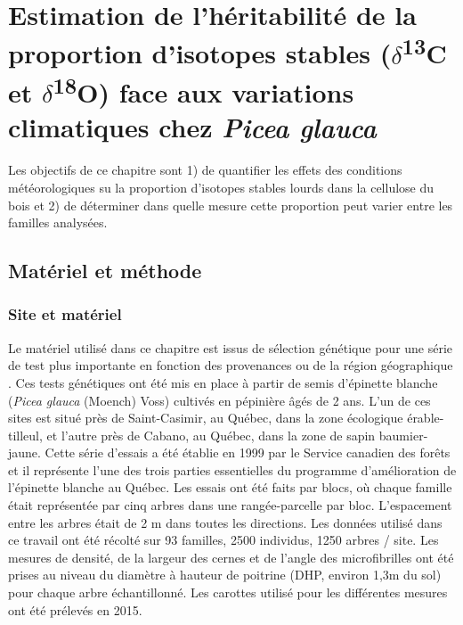 \documentclass{report}
\newcommand{\Ctreize}{$\delta$\textsuperscript{13}C\xspace}
\newcommand{\Odixhuit}{$\delta$\textsuperscript{18}O\xspace}
\begin{document}
\chapter{Estimation de l'héritabilité de la proportion d'isotopes stables (\Ctreize et \Odixhuit) face aux variations climatiques chez \textit{Picea glauca}}


Les objectifs de ce chapitre sont 1) de quantifier les effets des conditions météorologiques su la proportion d'isotopes stables lourds dans la cellulose du bois et 2) de déterminer dans quelle mesure cette proportion peut varier entre les familles analysées. 

\section*{Matériel et méthode}

\subsection*{Site et matériel}
Le matériel utilisé dans ce chapitre est issus de sélection génétique pour une série de test plus importante en fonction des provenances ou de la région géographique \citep{Beaulieu1996}. Ces tests génétiques ont été mis en place à partir de semis d'épinette blanche (\textit{Picea glauca} (Moench) Voss) cultivés en pépinière âgés de 2 ans. L'un de ces sites est situé près de Saint-Casimir, au Québec, dans la zone écologique érable-tilleul, et l'autre près de Cabano, au Québec, dans la zone de sapin baumier-jaune. Cette série d'essais a été établie en 1999 par le Service canadien des forêts et il représente l'une des trois parties essentielles du programme d'amélioration de l'épinette blanche au Québec. Les essais ont été faits par blocs, où chaque famille était représentée par cinq arbres dans une rangée-parcelle par bloc. L'espacement entre les arbres était de 2 m dans toutes les directions.  Les données utilisé dans ce travail ont été récolté sur 93 familles, 2500 individus, 1250 arbres / site. Les mesures de densité, de la largeur des cernes et de l'angle des microfibrilles ont été prises au niveau du diamètre à hauteur de poitrine (DHP, environ 1,3m du sol) pour chaque arbre échantillonné. Les carottes utilisé pour les différentes mesures ont été prélevés en 2015.  \\
\end{document}
